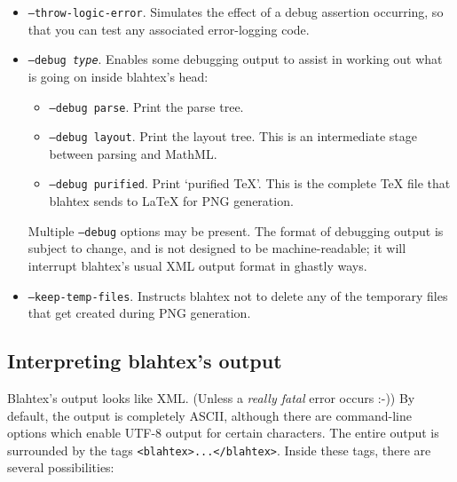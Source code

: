 \documentclass{article}
\begin{document}
\begin{itemize}
\item \texttt{--throw-logic-error}. Simulates the effect of a debug assertion occurring, so that you can test any associated error-logging code.
\item \texttt{--debug \textit{type}}. Enables some debugging output to assist in working out what is going on inside blahtex's head:
\begin{itemize}
\item \texttt{--debug parse}. Print the parse tree.
\item \texttt{--debug layout}. Print the layout tree. This is an intermediate stage between parsing and MathML.
\item \texttt{--debug purified}. Print `purified \TeX{}'. This is the complete \TeX{} file that blahtex sends to \LaTeX{} for PNG generation.
\end{itemize}
Multiple \texttt{--debug} options may be present. The format of debugging output is subject to change, and is not designed to be machine-readable; it will interrupt blahtex's usual XML output format in ghastly ways.
\item \texttt{--keep-temp-files}. Instructs blahtex not to delete any of the temporary files that get created during PNG generation.
\end{itemize}

\subsection{Interpreting blahtex's output}\label{sec:interpreting-output}

Blahtex's output looks like XML. (Unless a \emph{really fatal} error occurs :-)) By default, the output is completely ASCII, although there are command-line options which enable UTF-8 output for certain characters. The entire output is surrounded by the tags \texttt{<blahtex>...</blahtex>}. Inside these tags, there are several possibilities:
\end{document}
